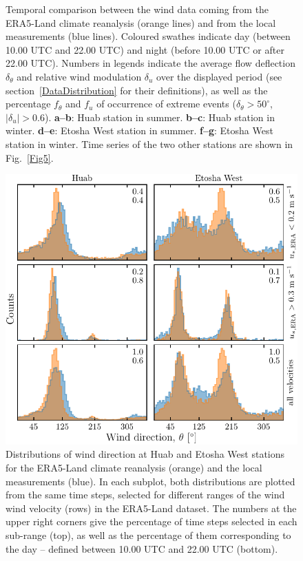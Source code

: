 \begin{figure}
\caption{Temporal comparison between the wind data coming from the ERA5-Land climate reanalysis (orange lines) and from the local measurements (blue lines). Coloured swathes indicate day (between 10.00 UTC and 22.00 UTC) and night (before 10.00 UTC or after 22.00 UTC). Numbers in legends indicate the average flow deflection $\delta_{\theta}$ and relative wind modulation $\delta_{u}$ over the displayed period (see section~\ref{DataDistribution} for their definitions), as well as the percentage $f_\theta$ and $f_u$ of occurrence of extreme events ($\delta_{\theta} > 50^\circ$, $\vert\delta_{u}\vert > 0.6$). \textbf{a--b}: Huab station in summer. \textbf{b--c}: Huab station in winter. \textbf{d--e}: Etosha West station in summer. \textbf{f--g}: Etosha West station in winter. Time series of the two other stations are shown in Fig.~\ref{Fig5}.}
\label{Fig3}
\end{figure}

\begin{figure}
\centering
\includegraphics[scale=1]{Figures/Figure4.pdf}
\caption{Distributions of wind direction at Huab and Etosha West stations for the ERA5-Land climate reanalysis (orange) and the local measurements (blue). In each subplot, both distributions are plotted from the same time steps, selected for different ranges of the wind wind velocity (rows) in the ERA5-Land dataset. The numbers at the upper right corners give the percentage of time steps selected in each sub-range (top), as well as the percentage of them corresponding to the day -- defined between 10.00 UTC and 22.00 UTC (bottom).}
\label{Fig4}
\end{figure}

